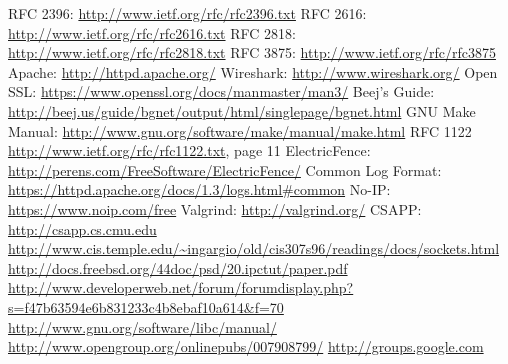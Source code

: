 
\begin{thebibliography}{1}
RFC 2396: \url{http://www.ietf.org/rfc/rfc2396.txt}
RFC 2616: \url{http://www.ietf.org/rfc/rfc2616.txt}
RFC 2818: \url{http://www.ietf.org/rfc/rfc2818.txt}
RFC 3875: \url{http://www.ietf.org/rfc/rfc3875}
Apache: \url{http://httpd.apache.org/}
Wireshark: \url{http://www.wireshark.org/}
Open SSL: \url{https://www.openssl.org/docs/manmaster/man3/}
Beej's Guide: \url{http://beej.us/guide/bgnet/output/html/singlepage/bgnet.html}
GNU Make Manual:  \url{http://www.gnu.org/software/make/manual/make.html}
RFC 1122 \url{http://www.ietf.org/rfc/rfc1122.txt}, page 11
ElectricFence: \url{http://perens.com/FreeSoftware/ElectricFence/}
Common Log Format: \url{https://httpd.apache.org/docs/1.3/logs.html#common}
No-IP: \url{https://www.noip.com/free}
Valgrind: \url{http://valgrind.org/}
CSAPP: \url{http://csapp.cs.cmu.edu}
\url{http://www.cis.temple.edu/~ingargio/old/cis307s96/readings/docs/sockets.html}
\url{http://docs.freebsd.org/44doc/psd/20.ipctut/paper.pdf}
\url{http://www.developerweb.net/forum/forumdisplay.php?s=f47b63594e6b831233c4b8ebaf10a614&f=70}
\url{http://www.gnu.org/software/libc/manual/}
\url{http://www.opengroup.org/onlinepubs/007908799/}
\url{http://groups.google.com}
\end{thebibliography}


